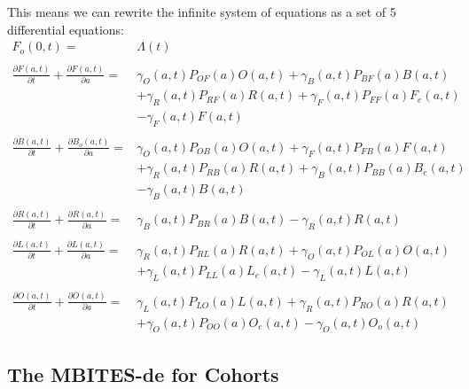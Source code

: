 \documentclass{article}
\begin{document}
This means we can rewrite the infinite system of equations as a
set of 5 differential equations: 
%
\begin{equation}\begin{array}{rl}
F_o(0,t) =& \Lambda(t) \\ 
%
&\\
\frac{\partial F(a,t)}{\partial t} + \frac{\partial F(a,t)}{\partial a} =& 
\gamma_O(a,t) P_{OF}(a) O(a,t) 
+ \gamma_B(a,t) P_{BF}(a) B(a,t) \\&
 + \gamma_R(a,t) P_{RF}(a) R(a,t)
+ \gamma_F(a,t) P_{FF}(a) F_e(a,t) \\ &
- \gamma_F(a,t) F(a,t) \\ 
%
%
&\\
\frac{\partial B(a,t)}{\partial t} + \frac{\partial B_o(a,t)}{\partial a} =&  \gamma_O(a,t) P_{OB}(a) O(a,t) + \gamma_F(a,t) P_{FB}(a) F(a,t) \\ & 
+ \gamma_R(a,t) P_{RB}(a) R(a,t) 
+ \gamma_B(a,t) P_{BB}(a) B_e(a,t)\\ & 
- \gamma_B(a,t) B(a,t) \\ 
%
&\\
\frac{\partial R(a,t)}{\partial t} + \frac{\partial R(a,t)}{\partial a} =&  \gamma_B(a,t) P_{BR}(a) B(a,t) - \gamma_R(a,t) R(a,t)\\ 
%
&\\
\frac{\partial L(a,t)}{\partial t} + \frac{\partial L(a,t)}{\partial a} =& \gamma_R(a,t) P_{RL}(a) R(a,t) + 
\gamma_O(a,t) P_{OL}(a) O(a,t) \\&
+ \gamma_L(a,t)  P_{LL}(a) L_e(a,t)
- \gamma_L(a,t)   L(a,t)
\\ 
%
&\\
\frac{\partial O(a,t)}{\partial t} + \frac{\partial O(a,t)}{\partial a} =& \gamma_L(a,t) P_{LO}(a) L(a,t) 
+ \gamma_R(a,t) P_{RO}(a) R(a,t)  
\\&
+ \gamma_O(a,t) P_{OO}(a) O_e(a,t)
- \gamma_O(a,t)  O_o(a,t)

%
\end{array}\end{equation}


\subsection{The MBITES-de for Cohorts}
\end{document}
